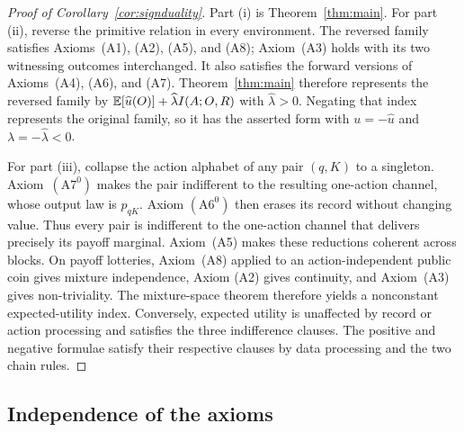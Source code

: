 \begin{proof}[Proof of Corollary~\ref{cor:signduality}]
Part \textup{(i)} is Theorem~\ref{thm:main}.  For part \textup{(ii)}, reverse
the primitive relation in every environment.  The reversed family satisfies
Axioms~\textup{(A1)}, \textup{(A2)}, \textup{(A5)}, and \textup{(A8)}; Axiom~\textup{(A3)} holds with
its two witnessing outcomes interchanged.  It also satisfies the forward
versions of Axioms~\textup{(A4)}, \textup{(A6)}, and
\textup{(A7)}.  Theorem~\ref{thm:main} therefore represents the reversed
family by
\(
  \mathbb E[\widehat u(O)]+\widehat\lambda I(A;O,R)
\)
with \(\widehat\lambda>0\).  Negating that index represents the original
family, so it has the asserted form with
\(u=-\widehat u\) and \(\lambda=-\widehat\lambda<0\).

For part \textup{(iii)}, collapse the action alphabet of any pair $(q,K)$ to
a singleton.  Axiom~$(\mathrm{A}7^0)$ makes the pair indifferent to the
resulting one-action channel, whose output law is $p_{qK}$.  Axiom
$(\mathrm{A}6^0)$ then erases its record without changing value.  Thus every
pair is indifferent to the one-action channel that delivers precisely its
payoff marginal.  Axiom~\textup{(A5)} makes these reductions coherent across
blocks.  On payoff lotteries, Axiom~\textup{(A8)} applied to an
action-independent public coin gives mixture independence, Axiom
\textup{(A2)} gives continuity, and Axiom~\textup{(A3)} gives
non-triviality.  The mixture-space theorem therefore yields a nonconstant
expected-utility index.  Conversely, expected utility is unaffected by record
or action processing and satisfies the three indifference clauses.  The
positive and negative formulae satisfy their respective clauses by data
processing and the two chain rules.
\end{proof}

\subsection{Independence of the axioms}

